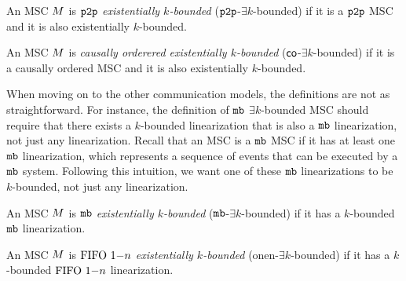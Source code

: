 \begin{definition}
	An MSC $M$ is \emph{$\mathtt{p2p}$ existentially $k$-bounded} ($\mathtt{p2p}$-$\exists k$-bounded) if it is a $\mathtt{p2p}$ MSC and it is also existentially $k$-bounded.
\end{definition}
\begin{definition}
	An MSC $M$ is \emph{causally orderered existentially $k$-bounded} ($\mathsf{co}$-$\exists k$-bounded) if it is a causally ordered MSC and it is also existentially $k$-bounded.
\end{definition}

When moving on to the other communication models, the definitions are not as straightforward. For instance, the definition of $\mathtt{mb}$ $\exists k$-bounded MSC should require that there exists a $k$-bounded linearization that is also a $\mathtt{mb}$ linearization, not just any linearization. Recall that an MSC is a $\mathtt{mb}$ MSC if it has at least one $\mathtt{mb}$ linearization, which represents a sequence of events that can be executed by a $\mathtt{mb}$ system. Following this intuition, we want one of these $\mathtt{mb}$ linearizations to be $k$-bounded, not just any linearization.

\begin{definition}
	An MSC $M$ is \emph{$\mathtt{mb}$ existentially $k$-bounded} ($\mathtt{mb}$-$\exists k$-bounded) if it has a $k$-bounded $\mathtt{mb}$ linearization.
\end{definition}

\begin{definition}
	An MSC $M$ is \emph{$\text{FIFO } 1\mathsf{-}n$ existentially $k$-bounded} (onen-$\exists k$-bounded) if it has a $k$-bounded $\text{FIFO } 1\mathsf{-}n$ linearization.
\end{definition}

